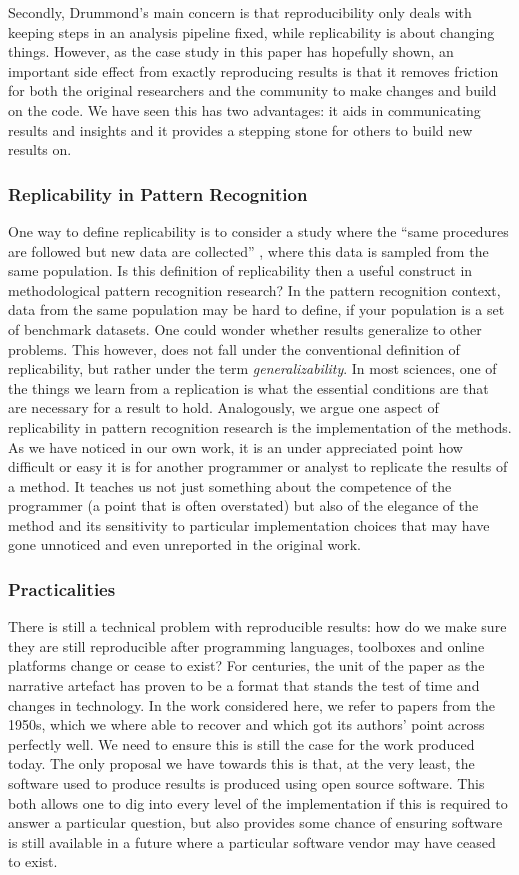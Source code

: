 \documentclass[twoside]{memoir}\usepackage[]{graphicx}\usepackage{xcolor}
\renewcommand{\cite}{\citep}
\begin{document}
Secondly, Drummond's main concern is that reproducibility only deals with keeping steps in an analysis pipeline fixed, while replicability is about changing things. However, as the case study in this paper has hopefully shown, an important side effect from exactly reproducing results is that it removes friction for both the original researchers and the community to make changes and build on the code. We have seen this has two advantages: it aids in communicating results and insights and it provides a stepping stone for others to build new results on.

\subsubsection{Replicability in Pattern Recognition}
One way to define replicability is to consider a study where the ``same procedures are followed but new data are collected'' \cite{Goodman2016a}, where this data is sampled from the same population. Is this definition of replicability then a useful construct in methodological pattern recognition research? In the pattern recognition context, data from the same population may be hard to define, if your population is a set of benchmark datasets. One could wonder whether results generalize to other problems. This however, does not fall under the conventional definition of replicability, but rather under the term \emph{generalizability}. 
In most sciences, one of the things we learn from a replication is what the essential conditions are that are necessary for a result to hold. Analogously, we argue one aspect of replicability in pattern recognition research is the implementation of the methods. As we have noticed in our own work, it is an under appreciated point how difficult or easy it is for another programmer or analyst to replicate the results of a method. It teaches us not just something about the competence of the programmer (a point that is often overstated) but also of the elegance of the method and its sensitivity to particular implementation choices that may have gone unnoticed and even unreported in the original work.

\subsubsection{Practicalities}
There is still a technical problem with reproducible results: how do we make sure they are still reproducible after programming languages, toolboxes and online platforms change or cease to exist? For centuries, the unit of the paper as the narrative artefact has proven to be a format that stands the test of time and changes in technology. In the work considered here, we refer to papers from the 1950s, which we where able to recover and which got its authors' point across perfectly well. We need to ensure this is still the case for the work produced today. The only proposal we have towards this is that, at the very least, the software used to produce results is produced using open source software. This both allows one to dig into every level of the implementation if this is required to answer a particular question, but also provides some chance of ensuring software is still available in a future where a particular software vendor may have ceased to exist.
\end{document}
